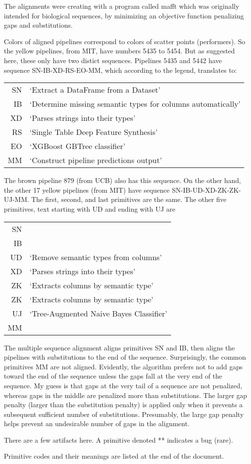 \documentclass{article}
\begin{document}
The alignments were creating with a program called mafft which was
originally intended for biological sequences, by minimizing an
objective function penalizing gaps and substitutions.

Colors of aligned pipelines correspond to colors of scatter points
(performers).  So the yellow pipelines, from MIT, have numbers 5435 to
5454.  But as suggested here, these only have two distict sequences.
Pipelines 5435 and 5442 have sequence SN-IB-XD-RS-EO-MM, which
according to the legend, translates to:

\begin{tabular}{rl}
SN & `Extract a DataFrame from a Dataset' \\
IB & `Determine missing semantic types for columns automatically' \\
XD & `Parses strings into their types' \\
RS & `Single Table Deep Feature Synthesis' \\
EO & `XGBoost GBTree classifier' \\
MM & `Construct pipeline predictions output'
\end{tabular}

The brown pipeline 879 (from UCB) also has this sequence.  On the
other hand, the other 17 yellow pipelines (from MIT) have sequence
SN-IB-UD-XD-ZK-ZK-UJ-MM.  The first, second, and last primitives are
the same.  The other five primitives, text starting with UD and ending with
UJ are

\begin{tabular}{rl}
  SN & \\
  IB & \\
UD & `Remove semantic types from columns' \\
XD & `Parses strings into their types' \\
ZK & `Extracts columns by semantic type' \\
ZK & `Extracts columns by semantic type' \\
UJ & `Tree-Augmented Naive Bayes Classifier' \\
MM & 
\end{tabular}
The multiple sequence alignment aligns primitives SN and IB, then
aligns the pipelines with substitutions to the end of the sequence.
Surprisingly, the common primitives MM are not aligned.  Evidently,
the algorithm prefers not to add gaps toward the end of the sequence
unless the gaps fall at the very end of the sequence.  My guess is
that gaps at the very tail of a sequence are not penalized, whereas
gaps in the middle are penalized more than substitutions.  The larger
gap penalty (larger than the substitution penalty) is applied only
when it prevents a subsequent sufficient number of substitutions.
Presumably, the large gap penalty helps prevent an undesirable number
of gaps in the alignment.


There are a few artifacts here.  A primitive denoted ** indicates a
bug (rare).

Primitive codes and their meanings are listed at the end of the document.
\end{document}

